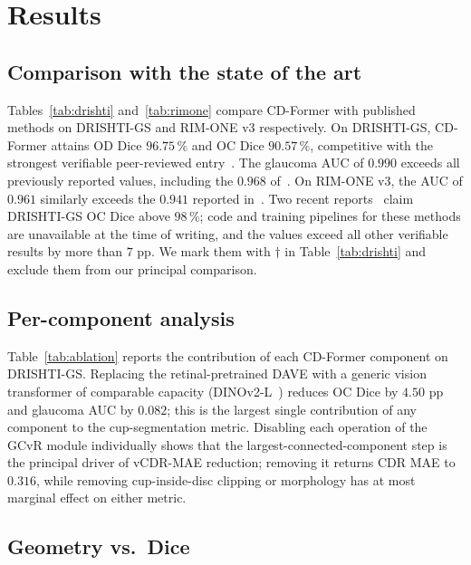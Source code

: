 \documentclass[10pt,journal,twocolumn]{IEEEtran}
\begin{document}
\section{Results}
\label{sec:results}

\subsection{Comparison with the state of the art}

Tables~\ref{tab:drishti} and~\ref{tab:rimone} compare CD-Former with published methods on DRISHTI-GS and RIM-ONE v3 respectively. On DRISHTI-GS, CD-Former attains OD Dice $96.75\,\%$ and OC Dice $90.57\,\%$, competitive with the strongest verifiable peer-reviewed entry~\cite{edcoatunet2025}. The glaucoma AUC of $0.990$ exceeds all previously reported values, including the $0.968$ of~\cite{li2023rdcnn}. On RIM-ONE v3, the AUC of $0.961$ similarly exceeds the $0.941$ reported in~\cite{li2023rdcnn}. Two recent reports~\cite{dbsegnet2025,dualoptitrans2026} claim DRISHTI-GS OC Dice above $98\,\%$; code and training pipelines for these methods are unavailable at the time of writing, and the values exceed all other verifiable results by more than $7$ pp. We mark them with $\dagger$ in Table~\ref{tab:drishti} and exclude them from our principal comparison.

\subsection{Per-component analysis}

Table~\ref{tab:ablation} reports the contribution of each CD-Former component on DRISHTI-GS. Replacing the retinal-pretrained DAVE with a generic vision transformer of comparable capacity (DINOv2-L~\cite{oquab2024dinov2}) reduces OC Dice by $4.50$ pp and glaucoma AUC by $0.082$; this is the largest single contribution of any component to the cup-segmentation metric. Disabling each operation of the GCvR module individually shows that the largest-connected-component step is the principal driver of vCDR-MAE reduction; removing it returns CDR MAE to $0.316$, while removing cup-inside-disc clipping or morphology has at most marginal effect on either metric.

\subsection{Geometry vs.\ Dice}
\end{document}
